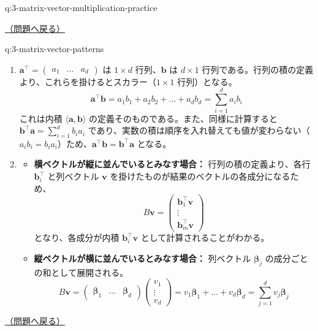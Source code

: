 \documentclass[
  pandoc]{bxjsarticle}
\providecommand{\tightlist}{%
  \setlength{\itemsep}{0pt}\setlength{\parskip}{0pt}}
\begin{document}
\begin{answerbox}[phantomlabel=a:3-matrix-vector-multiplication-practice]{q:3-matrix-vector-multiplication-practice}
\hfill 

\hyperref[q:3-matrix-vector-multiplication-practice]{（問題へ戻る）}

\end{answerbox}

\begin{answerbox}[phantomlabel=a:3-matrix-vector-patterns]{q:3-matrix-vector-patterns}

\begin{enumerate}
\def\labelenumi{\arabic{enumi}.}
\tightlist
\item
  \(\mathbf{a}^\top = \begin{pmatrix} a_1 & \dots & a_d \end{pmatrix}\)
  は \(1 \times d\) 行列、\(\mathbf{b}\) は \(d \times 1\)
  行列である。行列の積の定義より、これらを掛けるとスカラー（\(1 \times 1\)
  行列）となる。 \[
  \mathbf{a}^\top \mathbf{b} = a_1 b_1 + a_2 b_2 + \dots + a_d b_d = \sum_{i=1}^d a_i b_i
  \] これは内積 \(\langle \mathbf{a}, \mathbf{b} \rangle\)
  の定義そのものである。また、同様に計算すると
  \(\mathbf{b}^\top \mathbf{a} = \sum_{i=1}^d b_i a_i\)
  であり、実数の積は順序を入れ替えても値が変わらない（\(a_i b_i = b_i a_i\)）ため、\(\mathbf{a}^\top \mathbf{b} = \mathbf{b}^\top \mathbf{a}\)
  となる。
\item
  \begin{itemize}
  \tightlist
  \item
    \textbf{横ベクトルが縦に並んでいるとみなす場合：}
    行列の積の定義より、各行 \(\mathbf{b}_i^\top\) と列ベクトル
    \(\mathbf{v}\) を掛けたものが結果のベクトルの各成分になるため、 \[
    B\mathbf{v} = \begin{pmatrix} \mathbf{b}_1^\top \mathbf{v} \\ \vdots \\ \mathbf{b}_m^\top \mathbf{v} \end{pmatrix}
    \] となり、各成分が内積 \(\mathbf{b}_i^\top \mathbf{v}\)
    として計算されることがわかる。
  \item
    \textbf{縦ベクトルが横に並んでいるとみなす場合：} 列ベクトル
    \(\boldsymbol{\beta}_j\) の成分ごとの和として展開される。 \[
    B\mathbf{v} = \begin{pmatrix} \boldsymbol{\beta}_1 & \dots & \boldsymbol{\beta}_d \end{pmatrix} \begin{pmatrix} v_1 \\ \vdots \\ v_d \end{pmatrix} = v_1 \boldsymbol{\beta}_1 + \dots + v_d \boldsymbol{\beta}_d = \sum_{j=1}^d v_j \boldsymbol{\beta}_j
    \]
  \end{itemize}
\end{enumerate}

\hfill 

\hyperref[q:3-matrix-vector-patterns]{（問題へ戻る）}

\end{answerbox}
\end{document}
